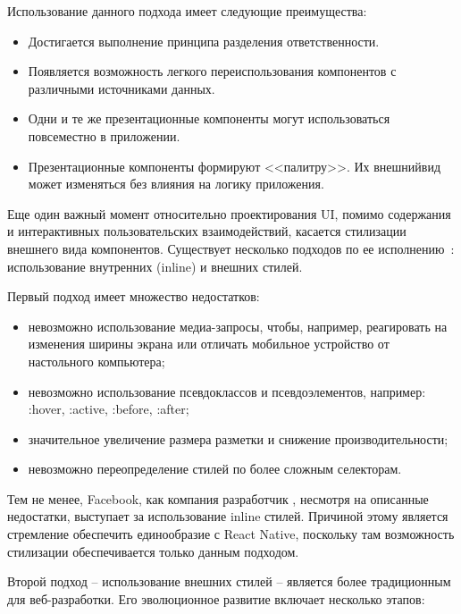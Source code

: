 Использование данного подхода имеет следующие преимущества:

\begin{itemize}
	\item Достигается выполнение принципа разделения ответственности.
	\item Появляется возможность легкого переиспользования компонентов с различными источниками данных.
	\item Одни и те же презентационные компоненты могут использоваться повсеместно в приложении.
	\item Презентационные компоненты формируют <<палитру>>. Их внешний\linebreak вид может изменяться без влияния на логику приложения.
\end{itemize}

Еще один важный момент относительно проектирования UI, помимо содержания и интерактивных пользовательских взаимодействий, касается стилизации внешнего вида компонентов. Существует несколько подходов по ее исполнению~\cite{styling_react}: использование внутренних (inline) и внешних стилей.

Первый подход имеет множество недостатков:

\begin{itemize}
	\item невозможно использование медиа-запросы, чтобы, например, реагировать на изменения ширины экрана или отличать мобильное устройство от настольного компьютера;
	\item невозможно использование псевдоклассов и псевдоэлементов, например: :hover, :active, :before, :after;
	\item значительное увеличение размера разметки и снижение производительности;
	\item невозможно переопределение стилей по более сложным селекторам.
\end{itemize}

Тем не менее, Facebook, как компания разработчик \react, несмотря на описанные недостатки, выступает за использование inline стилей. Причиной этому является стремление обеспечить единообразие с React Native, поскольку там возможность стилизации обеспечивается только данным подходом.

Второй подход -- использование внешних стилей -- является более традиционным для веб-разработки. Его эволюционное развитие включает несколько этапов:


